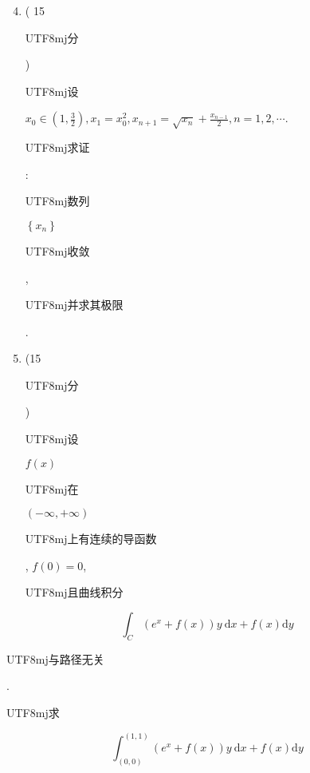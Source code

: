 \documentclass[10pt]{article}
\begin{document}
\begin{enumerate}
  \setcounter{enumi}{3}
  \item ( 15 \begin{CJK}{UTF8}{mj}分\end{CJK}) \begin{CJK}{UTF8}{mj}设\end{CJK} $x_{0} \in\left(1, \frac{3}{2}\right), x_{1}=x_{0}^{2}, x_{n+1}=\sqrt{x_{n}}+\frac{x_{n-1}}{2}, n=1,2, \cdots$. \begin{CJK}{UTF8}{mj}求证\end{CJK}: \begin{CJK}{UTF8}{mj}数列\end{CJK} $\left\{x_{n}\right\}$ \begin{CJK}{UTF8}{mj}收敛\end{CJK}, \begin{CJK}{UTF8}{mj}并求其极限\end{CJK}.

  \item (15 \begin{CJK}{UTF8}{mj}分\end{CJK}) \begin{CJK}{UTF8}{mj}设\end{CJK} $f(x)$ \begin{CJK}{UTF8}{mj}在\end{CJK} $(-\infty,+\infty)$ \begin{CJK}{UTF8}{mj}上有连续的导函数\end{CJK}, $f(0)=0$, \begin{CJK}{UTF8}{mj}且曲线积分\end{CJK}

\end{enumerate}
$$
\int_{C}\left(e^{x}+f(x)\right) y \mathrm{~d} x+f(x) \mathrm{d} y
$$
\begin{CJK}{UTF8}{mj}与路径无关\end{CJK}. \begin{CJK}{UTF8}{mj}求\end{CJK}
$$
\int_{(0,0)}^{(1,1)}\left(e^{x}+f(x)\right) y \mathrm{~d} x+f(x) \mathrm{d} y
$$
\end{document}
